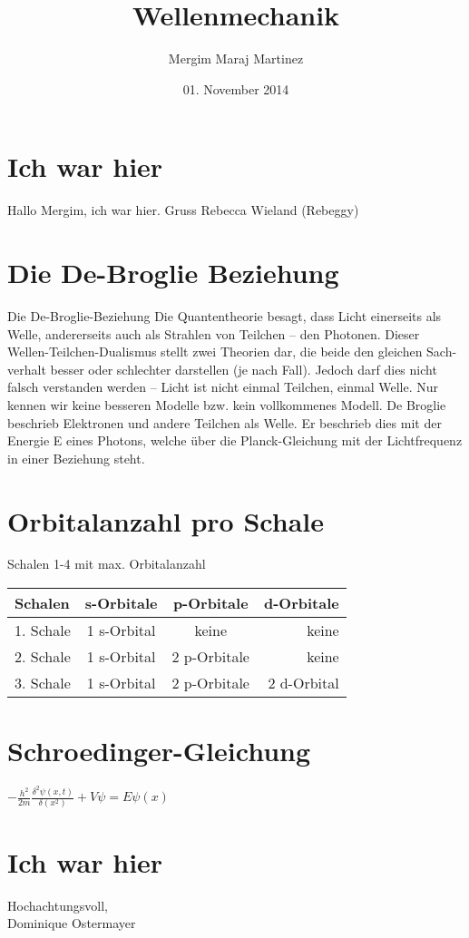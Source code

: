 \documentclass{article}
\author{Mergim Maraj Martinez}
\title{Wellenmechanik}
\date{01. November 2014}
\begin{document}
\maketitle

\section{Ich war hier}
Hallo Mergim, ich war hier. Gruss Rebecca Wieland (Rebeggy)
\section{Die De-Broglie Beziehung}
Die De-Broglie-Beziehung
Die Quantentheorie besagt, dass Licht einerseits als Welle, andererseits auch als Strahlen von Teilchen – den Photonen. Dieser Wellen-Teilchen-Dualismus stellt zwei Theorien dar, die beide den gleichen Sach-verhalt besser oder schlechter darstellen (je nach Fall). Jedoch darf dies nicht falsch verstanden werden – Licht ist nicht einmal Teilchen, einmal Welle. Nur kennen wir keine besseren Modelle bzw. kein vollkommenes Modell. De Broglie beschrieb Elektronen und andere Teilchen als Welle. Er beschrieb dies mit der Energie E eines Photons, welche über die Planck-Gleichung mit der Lichtfrequenz in einer Beziehung steht.

\section{Orbitalanzahl pro Schale}
Schalen 1-4 mit max. Orbitalanzahl
\begin{center}
\begin{tabular}{l|c|c|r}
Schalen & s-Orbitale & p-Orbitale & d-Orbitale\\
\hline
1. Schale & 1 s-Orbital & keine & keine \\
2. Schale & 1 s-Orbital & 2 p-Orbitale & keine\\
3. Schale & 1 s-Orbital & 2 p-Orbitale & 2 d-Orbital\\
\end{tabular}
\end{center}
\section{Schroedinger-Gleichung}
\begin{center}
$-\frac{h^{2}}{2m}\frac{\delta^{2}\psi(x,t)}{\delta(x^{2})}+V\psi=E\psi(x)$
\end{center}

\section{Ich war hier}
Hochachtungsvoll, \\
Dominique Ostermayer 
\end{document}

